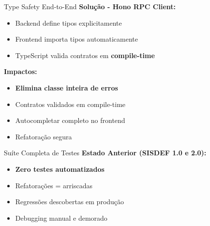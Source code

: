 \documentclass[aspectratio=169,xcolor=table]{beamer}
\begin{document}
\begin{frame}{Type Safety End-to-End}
    \textbf{Solução - Hono RPC Client:}
    \begin{itemize}
        \item Backend define tipos explicitamente
        \item Frontend importa tipos automaticamente
        \item TypeScript valida contratos em \textbf{compile-time}
    \end{itemize}
    
    \vspace{0.5em}
    \textbf{Impactos:}
    \begin{itemize}
        \item  \textbf{Elimina classe inteira de erros}
        \item  Contratos validados em compile-time
        \item  Autocompletar completo no frontend
        \item  Refatoração segura
    \end{itemize}
\end{frame}

\begin{frame}{Suíte Completa de Testes}
    \textbf{Estado Anterior (SISDEF 1.0 e 2.0):}
    \begin{itemize}
        \item \textbf{Zero testes automatizados}
        \item Refatorações = arriscadas
        \item Regressões descobertas em produção
        \item Debugging manual e demorado
    \end{itemize}
\end{frame}
\end{document}
